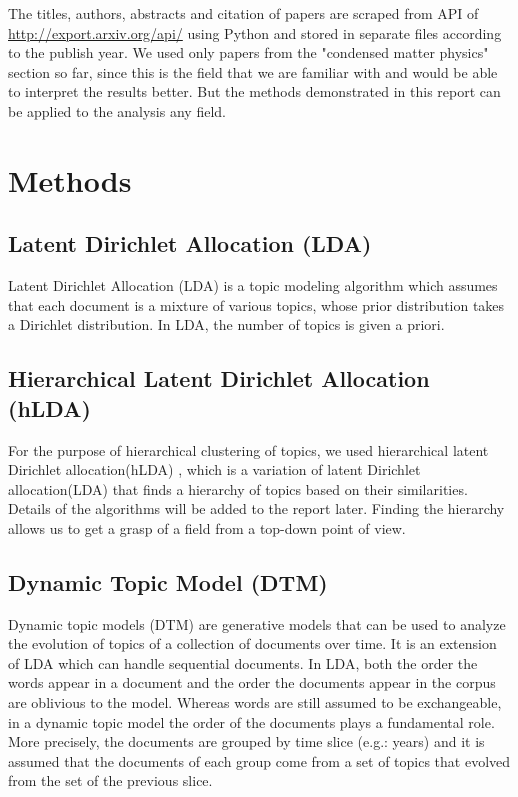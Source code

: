 \documentclass[DIV=calc, paper=a4, fontsize=11pt, twocolumn]{scrartcl}	 %
\begin{document}
The titles, authors, abstracts and citation of papers are scraped from API of \url{http://export.arxiv.org/api/} using Python and stored in separate files according to the publish year. We used only papers from the "condensed matter physics" section so far, since this is the field that we are familiar with and would be able to interpret the results better. But the methods demonstrated in this report can be applied to the analysis any field.

\section*{Methods}

\subsection*{Latent Dirichlet Allocation (LDA)}
Latent Dirichlet Allocation (LDA) \cite{2} is a topic modeling algorithm which assumes that each document is a mixture of various topics, whose prior distribution takes a Dirichlet distribution. In LDA, the number of topics is given a priori.

\subsection*{Hierarchical Latent Dirichlet Allocation (hLDA)}
For the purpose of hierarchical clustering of topics, we used hierarchical latent Dirichlet allocation(hLDA) \cite{1}, which is a variation of latent Dirichlet allocation(LDA) \cite{2} that finds a hierarchy of topics based on their similarities. Details of the algorithms will be added to the report later. Finding the hierarchy allows us to get a grasp of a field from a top-down point of view. 

\subsection*{Dynamic Topic Model (DTM)}
Dynamic topic models (DTM) \cite{3} are generative models that can be used to analyze the evolution of topics of a collection of documents over time. It is an extension of LDA which can handle sequential documents.\newline
In LDA, both the order the words appear in a document and the order the documents appear in the corpus are oblivious to the model. Whereas words are still assumed to be exchangeable, in a dynamic topic model the order of the documents plays a fundamental role. More precisely, the documents are grouped by time slice (e.g.: years) and it is assumed that the documents of each group come from a set of topics that evolved from the set of the previous slice.
\end{document}
